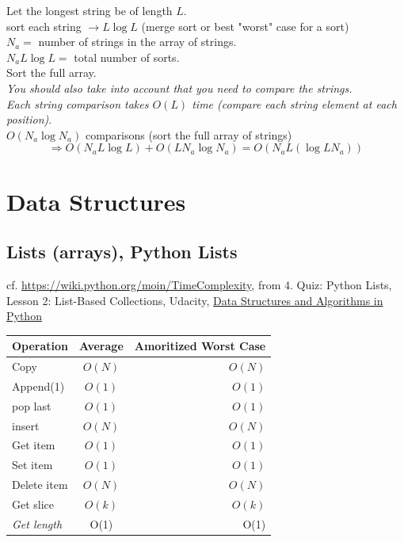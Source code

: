 \documentclass[10pt]{amsart}
\begin{document}
\begin{multicols*}{2}
Let the longest string be of length $L$. \\
sort each string $\to L\log{L}$ (merge sort or best "worst" case for a sort) \\
$N_a= $ number of strings in the array of strings. \\
$N_a L \log{L} = $ total number of sorts. \\

Sort the full array.\\
\emph{You should also take into account that you need to compare the strings.} \\
\emph{Each string comparison takes $O(L)$ time (compare each string element at each position)}. \\
$O(N_a \log{N_a})$ comparisons (sort the full array of strings) \\

\[
\Longrightarrow \boxed{ O(N_a L \log{L}) + O(L N_a \log{N_a}) = O(N_aL (\log{LN_a})) }
\]



\section{Data Structures}

\subsection{Lists (arrays), Python Lists}

cf. \url{https://wiki.python.org/moin/TimeComplexity}, from 4. Quiz: Python Lists, Lesson 2: List-Based Collections, Udacity, \href{https://classroom.udacity.com/courses/ud513/lessons/7117335401/concepts/78894523130923}{Data Structures and Algorithms in Python}
\begin{center}
	\begin{tabular}{ l | c | r }
		\hline
		Operation & Average & Amoritized Worst Case \\ \hline
		Copy & $O(N)$ & $O(N)$ \\ \hline
		Append(1) & $O(1)$ & $O(1)$ \\ \hline
		pop last & $O(1)$ & $O(1)$ \\ \hline
		insert & $O(N)$ & $O(N)$ \\ \hline
		Get item & $O(1)$ & $O(1)$ \\ \hline
		Set item & $O(1)$ & $O(1)$ \\ \hline
		Delete item & $O(N)$ & $O(N)$ \\ \hline
		Get slice & $O(k)$ & $O(k)$ \\ \hline		
		\emph{Get length} & O(1) & O(1) \\ \hline
		\hline
	\end{tabular}
\end{center}


\end{multicols*}
\end{document}

